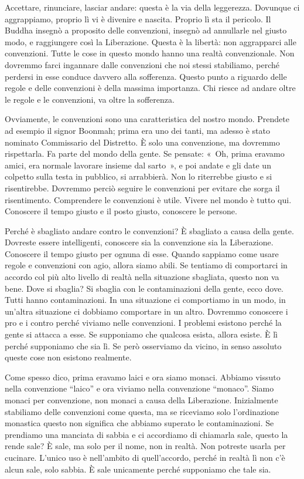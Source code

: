 Accettare, rinunciare, lasciar andare: questa è la via della leggerezza.
Dovunque ci aggrappiamo, proprio lì vi è divenire e nascita. Proprio lì
sta il pericolo. Il Buddha insegnò a proposito delle convenzioni,
insegnò ad annullarle nel giusto modo, e raggiungere così la
Liberazione. Questa è la libertà: non aggrapparci alle convenzioni.
Tutte le cose in questo mondo hanno una realtà convenzionale. Non
dovremmo farci ingannare dalle convenzioni che noi stessi stabiliamo,
perché perdersi in esse conduce davvero alla sofferenza. Questo punto a
riguardo delle regole e delle convenzioni è della massima importanza.
Chi riesce ad andare oltre le regole e le convenzioni, va oltre la
sofferenza.

Ovviamente, le convenzioni sono una caratteristica del nostro mondo.
Prendete ad esempio il signor Boonmah; prima era uno dei tanti, ma
adesso è stato nominato Commissario del Distretto. È solo una
convenzione, ma dovremmo rispettarla. Fa parte del mondo della gente. Se
pensate: «~Oh, prima eravamo amici, era normale lavorare insieme dal
sarto~», e poi andate e gli date un colpetto sulla testa in pubblico, si
arrabbierà. Non lo riterrebbe giusto e si risentirebbe. Dovremmo perciò
seguire le convenzioni per evitare che sorga il risentimento.
Comprendere le convenzioni è utile. Vivere nel mondo è tutto qui.
Conoscere il tempo giusto e il posto giusto, conoscere le persone.

Perché è sbagliato andare contro le convenzioni? È sbagliato a causa
della gente. Dovreste essere intelligenti, conoscere sia la convenzione
sia la Liberazione. Conoscere il tempo giusto per ognuna di esse. Quando
sappiamo come usare regole e convenzioni con agio, allora siamo abili.
Se tentiamo di comportarci in accordo col più alto livello di realtà
nella situazione sbagliata, questo non va bene. Dove si sbaglia? Si
sbaglia con le contaminazioni della gente, ecco dove. Tutti hanno
contaminazioni. In una situazione ci comportiamo in un modo, in un'altra
situazione ci dobbiamo comportare in un altro. Dovremmo conoscere i pro
e i contro perché viviamo nelle convenzioni. I problemi esistono perché
la gente si attacca a esse. Se supponiamo che qualcosa esista, allora
esiste. È lì perché supponiamo che sia lì. Se però osserviamo da vicino,
in senso assoluto queste cose non esistono realmente.

Come spesso dico, prima eravamo laici e ora siamo monaci. Abbiamo
vissuto nella convenzione ``laico'' e ora viviamo nella convenzione
``monaco''. Siamo monaci per convenzione, non monaci a causa della
Liberazione. Inizialmente stabiliamo delle convenzioni come questa, ma
se riceviamo solo l'ordinazione monastica questo non significa che
abbiamo superato le contaminazioni. Se prendiamo una manciata di sabbia
e ci accordiamo di chiamarla sale, questo la rende sale? È sale, ma solo
per il nome, non in realtà. Non potreste usarla per cucinare. L'unico
uso è nell'ambito di quell'accordo, perché in realtà lì non c'è alcun
sale, solo sabbia. È sale unicamente perché supponiamo che tale sia.

